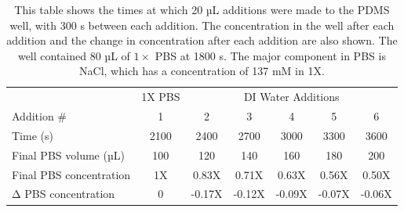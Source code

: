 \documentclass[
  a4paper,
]{scrbook}
\begin{document}
\hypertarget{tbl-salt-conc-series}{}
\begin{longtable}[t]{lcccccc}
\caption{\label{tbl-salt-conc-series}This table shows the times at which 20 µL additions were made to the
PDMS well, with 300 s between each addition. The concentration in the
well after each addition and the change in concentration after each
addition are also shown. The well contained 80 µL of \(1 \times\) PBS at
1800 s. The major component in PBS is NaCl, which has a concentration of
137 mM in 1X. }\tabularnewline

\toprule
\multicolumn{1}{c}{ } & \multicolumn{1}{c}{1X PBS} & \multicolumn{5}{c}{DI Water Additions} \\
\cmidrule(l{3pt}r{3pt}){2-2} \cmidrule(l{3pt}r{3pt}){3-7}
Addition \# & 1 & 2 & 3 & 4 & 5 & 6\\
\midrule
Time (s) & 2100 & 2400 & 2700 & 3000 & 3300 & 3600\\
Final PBS volume (µL) & 100 & 120 & 140 & 160 & 180 & 200\\
Final PBS concentration & 1X & 0.83X & 0.71X & 0.63X & 0.56X & 0.50X\\
Δ PBS concentration & 0 & -0.17X & -0.12X & -0.09X & -0.07X & -0.06X\\
\bottomrule
\end{longtable}
\end{document}
